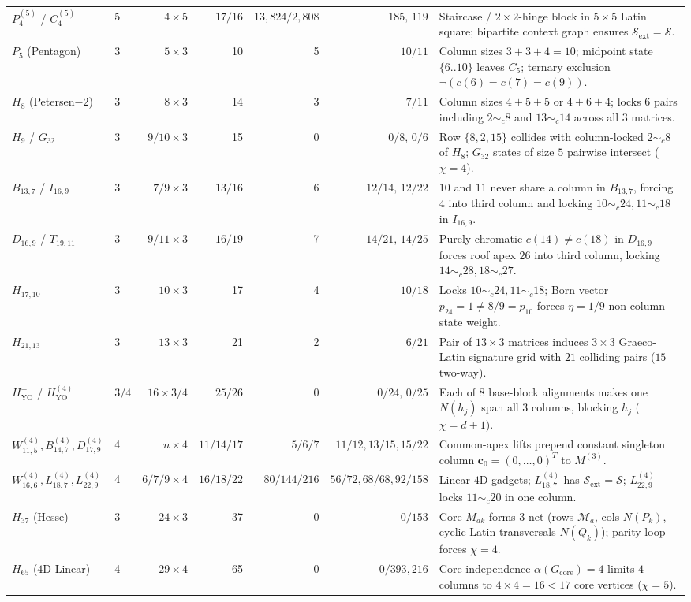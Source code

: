 \documentclass[aps,pra,reprint,superscriptaddress,longbibliography,nofootinbib,floatfix,10pt]{revtex4-2}
\theoremstyle{definition}\newtheorem{definition}[theorem]{Definition}
\theoremstyle{remark}\newtheorem{remark}[theorem]{Remark}
\newcommand{\Sc}{\mathcal S}\newcommand{\Cc}{\mathcal C}
\newcommand{\YO}{\mathrm{YO}}\newcommand{\ip}[2]{\langle #1,#2\rangle}
\begin{document}
\begin{table}[t]
\begin{tabular}{llrrrrp{}}
$P_4^{(5)}$ / $C_4^{(5)}$ & 5 & $4\times 5$ & $17/16$ & $13{,}824/2{,}808$ & $185,\,119$ & Staircase / $2\times 2$-hinge block in $5\times 5$ Latin square; bipartite context graph ensures $\Sc_{\mathrm{ext}}=\Sc$.\\
$P_5$ (Pentagon) & 3 & $5\times 3$ & 10 & 5 & $10/11$ & Column sizes $3+3+4=10$; midpoint state $\{6..10\}$ leaves $C_5$; ternary exclusion $\neg(c(6)=c(7)=c(9))$.\\
$H_8$ (Petersen$-2$) & 3 & $8\times 3$ & 14 & 3 & $7/11$ & Column sizes $4+5+5$ or $4+6+4$; locks $6$ pairs including $2\sim_c 8$ and $13\sim_c 14$ across all $3$ matrices.\\
$H_9$ / $G_{32}$ & 3 & $9/10\times 3$ & 15 & 0 & $0/8,\,0/6$ & Row $\{8,2,15\}$ collides with column-locked $2\sim_c 8$ of $H_8$; $G_{32}$ states of size $5$ pairwise intersect ($\chi=4$).\\
$B_{13,7}$ / $I_{16,9}$ & 3 & $7/9\times 3$ & $13/16$ & 6 & $12/14,\,12/22$ & $10$ and $11$ never share a column in $B_{13,7}$, forcing $4$ into third column and locking $10\sim_c 24,11\sim_c 18$ in $I_{16,9}$.\\
$D_{16,9}$ / $T_{19,11}$ & 3 & $9/11\times 3$ & $16/19$ & 7 & $14/21,\,14/25$ & Purely chromatic $c(14)\neq c(18)$ in $D_{16,9}$ forces roof apex $26$ into third column, locking $14\sim_c 28,18\sim_c 27$.\\
$H_{17,10}$ & 3 & $10\times 3$ & 17 & 4 & $10/18$ & Locks $10\sim_c 24,11\sim_c 18$; Born vector $p_{24}=1\neq 8/9=p_{10}$ forces $\eta=1/9$ non-column state weight.\\
$H_{21,13}$ & 3 & $13\times 3$ & 21 & 2 & $6/21$ & Pair of $13\times 3$ matrices induces $3\times 3$ Graeco-Latin signature grid with $21$ colliding pairs ($15$ two-way).\\
$H_{\YO}^+$ / $H_{\YO}^{(4)}$ & $3/4$ & $16\times 3/4$ & $25/26$ & 0 & $0/24,\,0/25$ & Each of $8$ base-block alignments makes one $N(h_j)$ span all $3$ columns, blocking $h_j$ ($\chi=d+1$).\\
$W_{11,5}^{(4)},B_{14,7}^{(4)},D_{17,9}^{(4)}$ & 4 & $n\times 4$ & $11/14/17$ & $5/6/7$ & $11/12,13/15,15/22$ & Common-apex lifts prepend constant singleton column $\mathbf{c}_0=(0,\ldots,0)^T$ to $M^{(3)}$.\\
$W_{16,6}^{(4)},L_{18,7}^{(4)},L_{22,9}^{(4)}$ & 4 & $6/7/9\times 4$ & $16/18/22$ & $80/144/216$ & $56/72,68/68,92/158$ & Linear $4$D gadgets; $L_{18,7}^{(4)}$ has $\Sc_{\mathrm{ext}}=\Sc$; $L_{22,9}^{(4)}$ locks $11\sim_c 20$ in one column.\\
$H_{37}$ (Hesse) & 3 & $24\times 3$ & 37 & 0 & $0/153$ & Core $M_{ak}$ forms $3$-net (rows $\mathcal{M}_a$, cols $N(P_k)$, cyclic Latin transversals $N(Q_k)$); parity loop forces $\chi=4$.\\
$H_{65}$ ($4$D Linear) & 4 & $29\times 4$ & 65 & 0 & $0/393{,}216$ & Core independence $\alpha(G_{\mathrm{core}})=4$ limits $4$ columns to $4\times 4=16<17$ core vertices ($\chi=5$).\\
\bottomrule\end{tabular}
\end{table}
\end{document}
